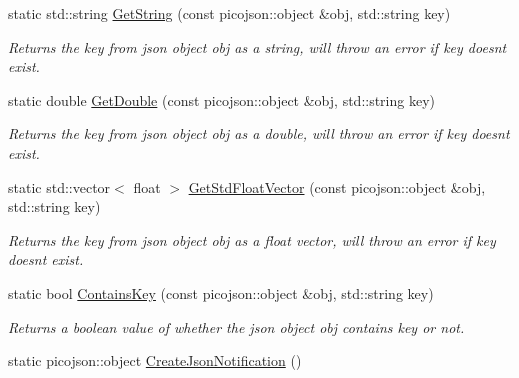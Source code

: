 \begin{DoxyCompactItemize}
static std\+::string \hyperlink{classcsci3081_1_1JsonHelper_af50a46a1f75f23c755e45b8477f69133}{Get\+String} (const picojson\+::object \&obj, std\+::string key)
\begin{DoxyCompactList}\small\item\em Returns the key from json object obj as a string, will throw an error if key doesn\textquotesingle{}t exist. \end{DoxyCompactList}\item 
\mbox{\label{classcsci3081_1_1JsonHelper_ae190f5c7e182d60c52d6b9e06dc97def}} 
static double \hyperlink{classcsci3081_1_1JsonHelper_ae190f5c7e182d60c52d6b9e06dc97def}{Get\+Double} (const picojson\+::object \&obj, std\+::string key)
\begin{DoxyCompactList}\small\item\em Returns the key from json object obj as a double, will throw an error if key doesn\textquotesingle{}t exist. \end{DoxyCompactList}\item 
\mbox{\label{classcsci3081_1_1JsonHelper_a0c243724051e5fb795c40701d66d844e}} 
static std\+::vector$<$ float $>$ \hyperlink{classcsci3081_1_1JsonHelper_a0c243724051e5fb795c40701d66d844e}{Get\+Std\+Float\+Vector} (const picojson\+::object \&obj, std\+::string key)
\begin{DoxyCompactList}\small\item\em Returns the key from json object obj as a float vector, will throw an error if key doesn\textquotesingle{}t exist. \end{DoxyCompactList}\item 
\mbox{\label{classcsci3081_1_1JsonHelper_acb0d4fa20d41a93d4076b447d732d0fa}} 
static bool \hyperlink{classcsci3081_1_1JsonHelper_acb0d4fa20d41a93d4076b447d732d0fa}{Contains\+Key} (const picojson\+::object \&obj, std\+::string key)
\begin{DoxyCompactList}\small\item\em Returns a boolean value of whether the json object obj contains key or not. \end{DoxyCompactList}\item 
\mbox{\label{classcsci3081_1_1JsonHelper_a5a69da28dbe3017826d53bdc6d17652f}} 
static picojson\+::object \hyperlink{classcsci3081_1_1JsonHelper_a5a69da28dbe3017826d53bdc6d17652f}{Create\+Json\+Notification} ()

\end{DoxyCompactItemize}

